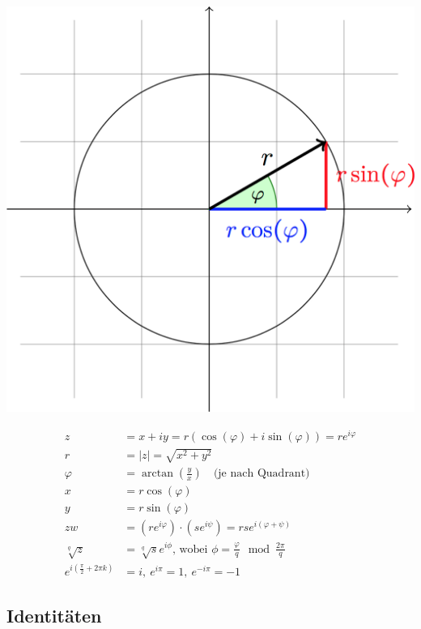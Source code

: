 \documentclass[11pt]{article}
\begin{document}
\begin{minipage}[c]{0.5\textwidth}
\centering
\includegraphics[width=\linewidth,keepaspectratio=true]{images/polarform}
\end{minipage}
%
\begin{minipage}[c]{0.5\textwidth}
\begin{equation*}
\begin{split}
	z & = x + iy = r(\cos(\varphi) + i\sin(\varphi)) = re^{i\varphi} \\
	r & = |z| = \sqrt{x^2 + y^2} \\
	\varphi & = \arctan(\frac{y}{x}) \quad \text{(je nach Quadrant)}  \\
	x & = r\cos(\varphi) \\
	y & = r\sin(\varphi) \\
	zw & = (re^{i\varphi})\cdot(se^{i\psi}) = rse^{i(\varphi + \psi)} \\
	\sqrt[q]{z} & = \sqrt[q]{s}e^{i\phi}\text{, wobei }\phi = \frac{\varphi}{q} \mod \frac{2\pi}{q} \\
	e^{i(\frac{\pi}{2} + 2\pi k)} & = i,\ e^{i\pi} = 1, \ e^{-i\pi} = -1
\end{split}
\end{equation*}
\end{minipage}

\subsection{Identit{\"a}ten}
\end{document}
